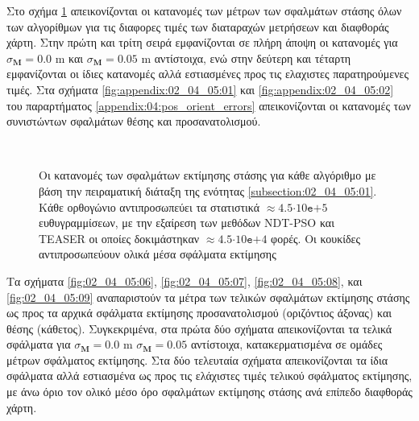 Στο σχήμα \ref{fig:02_04_05:05} απεικονίζονται οι κατανομές των μέτρων των
σφαλμάτων στάσης όλων των αλγορίθμων για τις διαφορες τιμές των διαταραχών
μετρήσεων και διαφθοράς χάρτη. Στην πρώτη και τρίτη σειρά εμφανίζονται σε πλήρη
άποψη οι κατανομές για $\sigma_{\bm{M}} = 0.0$ m και $\sigma_{\bm{M}} = 0.05$ m
αντίστοιχα, ενώ στην δεύτερη και τέταρτη εμφανίζονται οι ίδιες κατανομές αλλά
εστιασμένες προς τις ελαχιστες παρατηρούμενες τιμές. Στα σχήματα
\ref{fig:appendix:02_04_05:01} και \ref{fig:appendix:02_04_05:02} του
παραρτήματος \ref{appendix:04:pos_orient_errors} απεικονίζονται οι κατανομές
των συνιστώντων σφαλμάτων θέσης και προσανατολισμού.


\begin{figure}[!h]\centering\vspace{2cm}
  \begin{subfigure}{\linewidth}\hspace{-1cm}
    
  \end{subfigure}\\\vspace{3cm}%
  \begin{subfigure}{\linewidth}\hspace{-1cm}
    
  \end{subfigure}%
  \vspace{1cm}
\caption{\small Οι κατανομές των σφαλμάτων εκτίμησης στάσης για κάθε αλγόριθμο
         με βάση την πειραματική διάταξη της ενότητας
         \ref{subsection:02_04_05:01}. Κάθε ορθογώνιο αντιπροσωπεύει τα
         στατιστικά $\approx 4.5$$\cdot$$10\texttt{e}$$+$$5$ ευθυγραμμίσεων, με
         την εξαίρεση των μεθόδων NDT-PSO και TEASER οι οποίες δοκιμάστηκαν
         $\approx 4.5$$\cdot$$10\texttt{e}$$+$$4$ φορές. Οι κουκίδες
         αντιπροσωπεύουν ολικά μέσα σφάλματα εκτίμησης}
\label{fig:02_04_05:05}
\end{figure}


Τα σχήματα \ref{fig:02_04_05:06}, \ref{fig:02_04_05:07}, \ref{fig:02_04_05:08},
και \ref{fig:02_04_05:09} αναπαριστούν τα μέτρα των τελικών σφαλμάτων εκτίμησης
στάσης ως προς τα αρχικά σφάλματα εκτίμησης προσανατολισμού (οριζόντιος άξονας)
και θέσης (κάθετος). Συγκεκριμένα, στα πρώτα δύο σχήματα απεικονίζονται τα
τελικά σφάλματα για $\sigma_{\bm{M}} = 0.0$ m $\sigma_{\bm{M}} = 0.05$
αντίστοιχα, κατακερματισμένα σε ομάδες μέτρων σφάλματος εκτίμησης. Στα δύο
τελευταία σχήματα απεικονίζονται τα ίδια σφάλματα αλλά εστιασμένα ως προς τις
ελάχιστες τιμές τελικού σφάλματος εκτίμησης, με άνω όριο τον ολικό μέσο όρο
σφαλμάτων εκτίμησης στάσης ανά επίπεδο διαφθοράς χάρτη.


